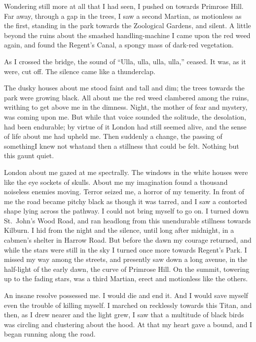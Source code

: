 Wondering still more at all that I had seen, I pushed on towards
Primrose Hill. Far away, through a gap in the trees, I saw a second
Martian, as motionless as the first, standing in the park towards
the Zoological Gardens, and silent. A little beyond the ruins about
the smashed handling-machine I came upon the red weed again, and
found the Regent's Canal, a spongy mass of dark-red vegetation.

As I crossed the bridge, the sound of ``Ulla, ulla, ulla, ulla,''
ceased. It was, as it were, cut off. The silence came like a
thunderclap.

The dusky houses about me stood faint and tall and dim; the trees
towards the park were growing black. All about me the red weed
clambered among the ruins, writhing to get above me in the dimness.
Night, the mother of fear and mystery, was coming upon me. But
while that voice sounded the solitude, the desolation, had been
endurable; by virtue of it London had still seemed alive, and the
sense of life about me had upheld me. Then suddenly a change, the
passing of something\dash{}I knew not what\dash{}and then a stillness that
could be felt. Nothing but this gaunt quiet.

London about me gazed at me spectrally. The windows in the white
houses were like the eye sockets of skulls. About me my imagination
found a thousand noiseless enemies moving. Terror seized me, a
horror of my temerity. In front of me the road became pitchy black
as though it was tarred, and I saw a contorted shape lying across
the pathway. I could not bring myself to go on. I turned down
St.\ John's Wood Road, and ran headlong from this unendurable stillness
towards Kilburn. I hid from the night and the silence, until long
after midnight, in a cabmen's shelter in Harrow Road. But before
the dawn my courage returned, and while the stars were still in the
sky I turned once more towards Regent's Park. I missed my way among
the streets, and presently saw down a long avenue, in the
half-light of the early dawn, the curve of Primrose Hill. On the
summit, towering up to the fading stars, was a third Martian, erect
and motionless like the others.

An insane resolve possessed me. I would die and end it. And I would
save myself even the trouble of killing myself. I marched on
recklessly towards this Titan, and then, as I drew nearer and the
light grew, I saw that a multitude of black birds was circling and
clustering about the hood. At that my heart gave a bound, and I
began running along the road.

